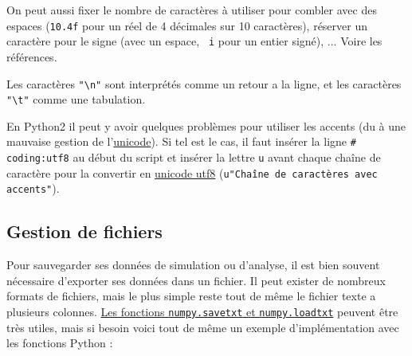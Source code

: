 \documentclass{article}
\begin{document}
On peut aussi fixer le nombre de caractères à utiliser pour combler avec des espaces (\texttt{10.4f} pour un réel de 4 décimales sur 10 caractères), réserver un caractère pour le signe (avec un espace, \texttt{ i} pour un entier signé), ... Voire les références.

Les caractères \texttt{"\textbackslash n"} sont interprétés comme un retour a la ligne, et les caractères \texttt{"\textbackslash t"} comme une tabulation.

En Python2 il peut y avoir quelques problèmes pour utiliser les accents (du à une mauvaise gestion de l'\href{https://fr.wikipedia.org/wiki/Unicode}{unicode}). Si tel est le cas, il faut insérer la ligne \texttt{\# coding:utf8} au début du script et insérer la lettre \texttt{u} avant chaque chaîne de caractère pour la convertir en \href{https://fr.wikipedia.org/wiki/UTF-8}{unicode utf8} (\texttt{u"Chaîne de caractères avec accents"}).

\subsection*{Gestion de fichiers}

Pour sauvegarder ses données de simulation ou d'analyse, il est bien souvent nécessaire d'exporter ses données dans un fichier. Il peut exister de nombreux formats de fichiers, mais le plus simple reste tout de même le fichier texte a plusieurs colonnes. \href{https://docs.scipy.org/doc/numpy/reference/routines.io.html#text-files}{Les fonctions \texttt{numpy.savetxt} et \texttt{numpy.loadtxt}} peuvent être très utiles, mais si besoin voici tout de même un exemple d'implémentation avec les fonctions Python :
\end{document}

